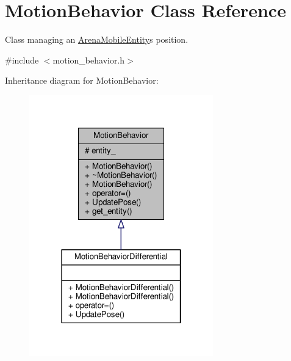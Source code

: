 \hypertarget{classMotionBehavior}{}\section{Motion\+Behavior Class Reference}
\label{classMotionBehavior}


Class managing an \hyperlink{classArenaMobileEntity}{Arena\+Mobile\+Entity}\textquotesingle{}s position.  




{\ttfamily \#include $<$motion\+\_\+behavior.\+h$>$}



Inheritance diagram for Motion\+Behavior\+:\nopagebreak
\begin{figure}[H]
\begin{center}
\leavevmode
\includegraphics[width=226pt]{classMotionBehavior__inherit__graph}
\end{center}
\end{figure}


